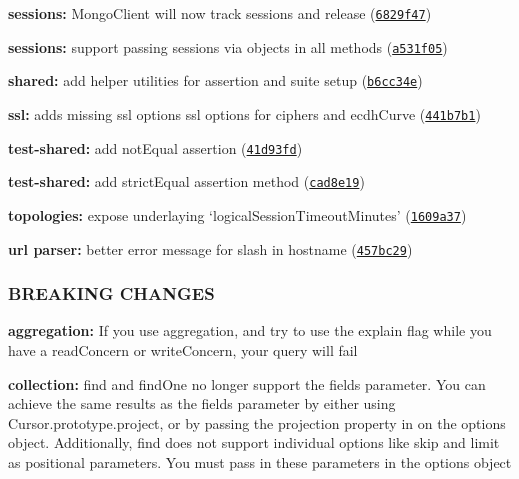 \begin{DoxyItemize}
\item {\bfseries sessions\+:} Mongo\+Client will now track sessions and release (\href{https://github.com/mongodb/node-mongodb-native/commit/6829f47}{\tt 6829f47})
\item {\bfseries sessions\+:} support passing sessions via objects in all methods (\href{https://github.com/mongodb/node-mongodb-native/commit/a531f05}{\tt a531f05})
\item {\bfseries shared\+:} add helper utilities for assertion and suite setup (\href{https://github.com/mongodb/node-mongodb-native/commit/b6cc34e}{\tt b6cc34e})
\item {\bfseries ssl\+:} adds missing ssl options ssl options for {\ttfamily ciphers} and {\ttfamily ecdh\+Curve} (\href{https://github.com/mongodb/node-mongodb-native/commit/441b7b1}{\tt 441b7b1})
\item {\bfseries test-\/shared\+:} add {\ttfamily not\+Equal} assertion (\href{https://github.com/mongodb/node-mongodb-native/commit/41d93fd}{\tt 41d93fd})
\item {\bfseries test-\/shared\+:} add {\ttfamily strict\+Equal} assertion method (\href{https://github.com/mongodb/node-mongodb-native/commit/cad8e19}{\tt cad8e19})
\item {\bfseries topologies\+:} expose underlaying `logical\+Session\+Timeout\+Minutes' (\href{https://github.com/mongodb/node-mongodb-native/commit/1609a37}{\tt 1609a37})
\item {\bfseries url parser\+:} better error message for slash in hostname (\href{https://github.com/mongodb/node-mongodb-native/commit/457bc29}{\tt 457bc29})
\end{DoxyItemize}

\subsubsection*{B\+R\+E\+A\+K\+I\+NG C\+H\+A\+N\+G\+ES}


\begin{DoxyItemize}
\item {\bfseries aggregation\+:} If you use aggregation, and try to use the explain flag while you have a read\+Concern or write\+Concern, your query will fail
\item {\bfseries collection\+:} {\ttfamily find} and {\ttfamily find\+One} no longer support the {\ttfamily fields} parameter. You can achieve the same results as the {\ttfamily fields} parameter by either using {\ttfamily Cursor.\+prototype.\+project}, or by passing the {\ttfamily projection} property in on the {\ttfamily options} object. Additionally, {\ttfamily find} does not support individual options like {\ttfamily skip} and {\ttfamily limit} as positional parameters. You must pass in these parameters in the {\ttfamily options} object
\end{DoxyItemize}

